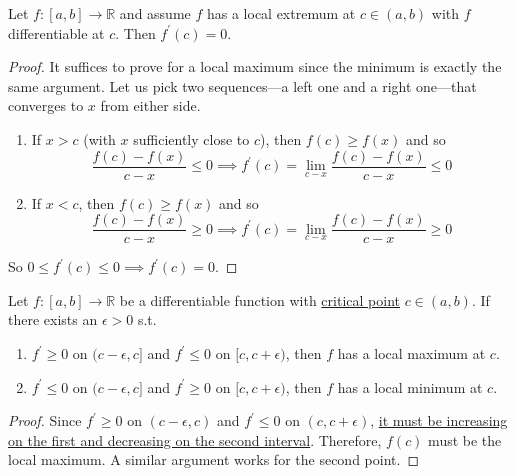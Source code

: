   \begin{theorem}
		\label{thm:fermat_interior_extremum}
    Let $f: [a, b] \to \mathbb{R}$ and assume $f$ has a local extremum at $c \in (a, b)$ with $f$ differentiable at $c$. Then $f^\prime (c) = 0$. 
  \end{theorem}
  \begin{proof}
    It suffices to prove for a local maximum since the minimum is exactly the same argument. Let us pick two sequences---a left one and a right one---that converges to $x$ from either side. 
    \begin{enumerate}
      \item If $x > c$ (with $x$ sufficiently close to $c$), then $f(c) \geq f(x)$ and so 
      \begin{equation}
        \frac{f(c) - f(x)}{c - x} \leq 0 \implies f^\prime (c) = \lim_{c - x} \frac{f(c) - f(x)}{c - x} \leq 0
      \end{equation}

      \item If $x < c$, then $f(c) \geq f(x)$ and so 
      \begin{equation}
        \frac{f(c) - f(x)}{c - x} \geq 0 \implies f^\prime (c) = \lim_{c - x} \frac{f(c) - f(x)}{c - x} \geq 0
      \end{equation}
    \end{enumerate}
    So $0 \leq f^\prime (c) \leq 0 \implies f^\prime(c) = 0$. 
  \end{proof}

	\begin{theorem}
	  \label{thm:first-derivative-test}
		Let $f: [a, b] \to \mathbb{R}$ be a differentiable function with \hyperref[def:critical-point]{critical point} $c \in (a, b)$. If there exists an $\epsilon > 0$ s.t. 
		\begin{enumerate}
			\item $f^\prime \geq 0$ on $(c - \epsilon, c]$ and $f^\prime \leq 0$ on $[c, c + \epsilon)$, then $f$ has a local maximum at $c$. 
			\item $f^\prime \leq 0$ on $(c - \epsilon, c]$ and $f^\prime \geq 0$ on $[c, c + \epsilon)$, then $f$ has a local minimum at $c$. 
		\end{enumerate}
	\end{theorem}
	\begin{proof}
		Since $f^\prime \geq 0$ on $(c - \epsilon, c)$ and $f^\prime \leq 0$ on $(c, c + \epsilon)$, \hyperref[thm:der_mono_func]{it must be increasing on the first and decreasing on the second interval}. Therefore, $f(c)$ must be the local maximum. A similar argument works for the second point. 
	\end{proof}

